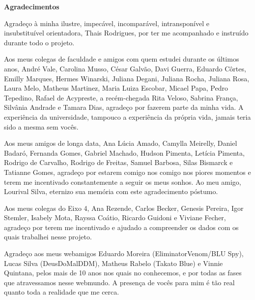 \documentclass[12pt, a4paper, twoside]{article}
\numberwithin{equation}{subsection} %
\begin{document}


\vspace*{2.5cm}

\begin{center}
 {\Huge \bfseries Agradecimentos}
\end{center}
\baselineskip 19.5pt 
\vspace*{1.5cm}

Agradeço à minha ilustre, impecável, incomparável, intransponível e insubstituível orientadora, Thais Rodrigues, por ter me acompanhado e instruído durante todo o projeto.

Aos meus colegas de faculdade e amigos com quem estudei durante os últimos anos, André Vale, Carolina Musso, César Galvão, Davi Guerra, Eduardo Côrtes, Emilly Marques, Hermes Winarski, Juliana Degani, Juliana Rocha, Juliana Rosa, Laura Melo, Matheus Martinez, Maria Luiza Escobar, Micael Papa, Pedro Tepedino, Rafael de Acypreste, a recém-chegada Rita Veloso, Sabrina França, Silvânia Andrade e Tamara Dias, agradeço por fazerem parte da minha vida. A experiência da universidade, tampouco a experiência da própria vida, jamais teria sido a mesma sem vocês.

Aos meus amigos de longa data, Ana Lúcia Amado, Camylla Meirelly, Daniel Badaró, Fernanda Gomes, Gabriel Machado, Hudson Pimenta, Letícia Pimenta, Rodrigo de Carvalho, Rodrigo de Freitas, Samuel Barbosa, Silas Bismarck e Tatianne Gomes, agradeço por estarem comigo nos comigo nos piores momentos e terem me incentivado constantemente a seguir os meus sonhos. Ao meu amigo, Lourival Silva,     eternizo sua memória com este agradecimento póstumo.

Aos meus colegas do Eixo 4, Ana Rezende, Carlos Becker, Genesis Pereira, Igor Stemler, Isabely Mota, Rayssa Coátio, Ricardo Guidoni e Viviane Fecher, agradeço por terem me incentivado e ajudado a compreender os dados com os quais trabalhei nesse projeto. 

Agradeço aos meus webamigos Eduardo Moreira (EliminatorVenom/BLU Spy), Lucas Silva (DeusDoMalDDM), Matheus Rabelo (Takato Blue) e Vinnie Quintana, pelos mais de 10 anos nos quais no conhecemos, e por todas as fases que atravessamos nesse webmundo. A presença de vocês para mim é tão real quanto toda a realidade que me cerca.
\end{document}
